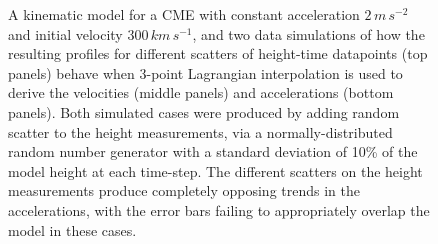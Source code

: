 \documentclass[structabstract]{aa}
\begin{document}
\begin{figure}[!t]
\caption{A kinematic model for a CME with constant acceleration $2\,m\,s^{-2}$ and initial velocity $300\,km\,s^{-1}$, and two data simulations of how the resulting profiles for different scatters of height-time datapoints (top panels) behave when 3-point Lagrangian interpolation is used to derive the velocities (middle panels) and accelerations (bottom panels). Both simulated cases were produced by adding random scatter to the height measurements, via a normally-distributed random number generator with a standard deviation of 10\% of the model height at each time-step. The different scatters on the height measurements produce completely opposing trends in the accelerations, with the error bars failing to appropriately overlap the model in these cases.}
\label{sim_vels_thesis}
\end{figure}
\end{document}
